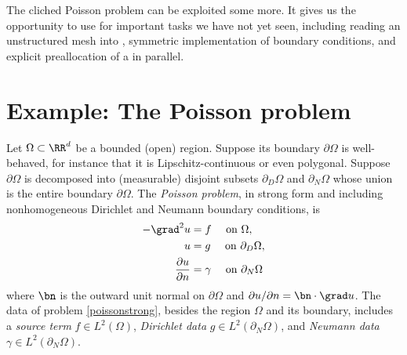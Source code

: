 
The cliched Poisson problem can be exploited some more.  It gives us the opportunity to use \PETSc for important tasks we have not yet seen, including reading an unstructured mesh into \PETSc \pVecs, symmetric implementation of boundary conditions, and explicit preallocation of a \pMat in parallel.

\section{Example: The Poisson problem}

Let $\Omega \subset \RR^d$ be a bounded (open) region.  Suppose its boundary $\partial\Omega$ is well-behaved, for instance that it is Lipschitz-continuous \citep[section 1.2]{Ciarlet2002} or even polygonal.  Suppose $\partial\Omega$ is decomposed into (measurable) disjoint subsets $\partial_D \Omega$ and $\partial_N \Omega$ whose union is the entire boundary $\partial \Omega$.  The \emph{Poisson problem}, in strong form and including nonhomogeneous Dirichlet and Neumann boundary conditions, is
\begin{align}
- \grad^2 u &= f \quad \text{ on } \Omega, \label{poissonstrong} \\
u &= g \quad \text{ on } \partial_D \Omega, \notag \\
\frac{\partial u}{\partial n} &= \gamma \quad \text{ on } \partial_N \Omega \notag
\end{align}
where $\bn$ is the outward unit normal on $\partial \Omega$ and $\partial u/\partial n = \bn \cdot \grad u$.  The data of problem \eqref{poissonstrong}, besides the region $\Omega$ and its boundary, includes a \emph{source term} $f\in L^2(\Omega)$, \emph{Dirichlet data} $g\in L^2(\partial_N \Omega)$, and \emph{Neumann data} $\gamma\in L^2(\partial_N \Omega)$.

